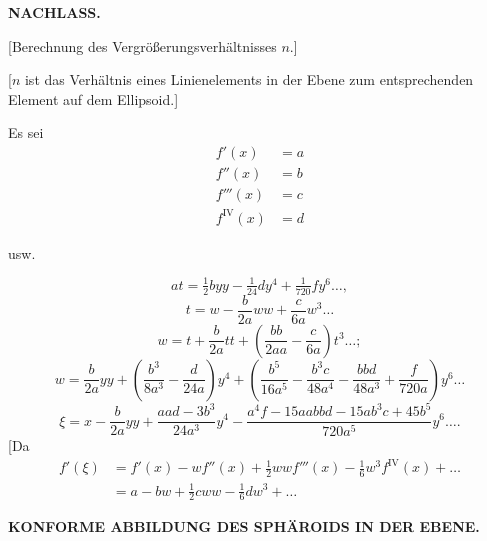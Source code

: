 \begingroup
\setlength{\abovedisplayskip}{7pt}
\setlength{\belowdisplayskip}{7pt}
\setlength{\abovedisplayshortskip}{3pt}
\setlength{\belowdisplayshortskip}{4pt}

\par\clearpage
\noindent{}\hfill{\small\textbf{NACHLASS.}}\hfill\null\par\medskip

\begin{center}
[Berechnung des Vergrößerungsverhältnisses \(n\).]\par\medskip
[6.]
\end{center}
[\(n\) ist das Verhältnis eines Linienelements in der Ebene zum entsprechenden
Element auf dem Ellipsoid.]

Es sei
\[
\begin{aligned}
f'(x)&=a\\
f''(x)&=b\\
f'''(x)&=c\\
f^{\mathrm{IV}}(x)&=d
\end{aligned}
\]
\centerline{usw.}
\[
at=\tfrac12byy-\tfrac1{24}dy^4+\tfrac1{720}fy^6\ldots,
\]
\noindent [so ist]
\[
t=w-\frac b{2a}ww+\frac c{6a}w^3\ldots
\]
\[
w=t+\frac b{2a}tt+\left(\frac{bb}{2aa}-\frac c{6a}\right)t^3\ldots;
\]
\[
w=\frac b{2a}yy+\left(\frac{b^3}{8a^3}-\frac d{24a}\right)y^4
+\left(\frac{b^5}{16a^5}-\frac{b^3c}{48a^4}-\frac{bbd}{48a^3}+\frac f{720a}\right)y^6\ldots
\]
\noindent [und]
\[
\xi=x-\frac b{2a}yy+\frac{aad-3b^3}{24a^3}y^4
-\frac{a^4f-15aabbd-15ab^3c+45b^5}{720a^5}y^6\ldots.
\]
[Da
\[
\begin{aligned}
f'(\xi)&=f'(x)-wf''(x)+\tfrac12wwf'''(x)-\tfrac16w^3f^{\mathrm{IV}}(x)+\ldots\\
&=a-bw+\tfrac12cww-\tfrac16dw^3+\ldots
\end{aligned}
\]

\par\clearpage
\noindent\null\hfill{\small\textbf{KONFORME ABBILDUNG DES SPHÄROIDS IN DER EBENE.}}\hfill{}\par\medskip

